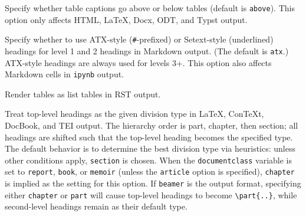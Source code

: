\documentclass[
]{article}
\begin{document}
\begin{description}
Specify whether table captions go above or below tables (default is
\texttt{above}). This option only affects HTML, LaTeX, Docx, ODT, and
Typst output.
\item[\texttt{-\/-markdown-headings=setext}\textbar{}\texttt{atx}]
Specify whether to use ATX-style (\texttt{\#}-prefixed) or Setext-style
(underlined) headings for level 1 and 2 headings in Markdown output.
(The default is \texttt{atx}.) ATX-style headings are always used for
levels 3+. This option also affects Markdown cells in \texttt{ipynb}
output.
\item[\texttt{-\/-list-tables{[}=true\textbar{}false{]}}]
Render tables as list tables in RST output.
\item[\texttt{-\/-top-level-division=default}\textbar{}\texttt{section}\textbar{}\texttt{chapter}\textbar{}\texttt{part}]
Treat top-level headings as the given division type in LaTeX, ConTeXt,
DocBook, and TEI output. The hierarchy order is part, chapter, then
section; all headings are shifted such that the top-level heading
becomes the specified type. The default behavior is to determine the
best division type via heuristics: unless other conditions apply,
\texttt{section} is chosen. When the \texttt{documentclass} variable is
set to \texttt{report}, \texttt{book}, or \texttt{memoir} (unless the
\texttt{article} option is specified), \texttt{chapter} is implied as
the setting for this option. If \texttt{beamer} is the output format,
specifying either \texttt{chapter} or \texttt{part} will cause top-level
headings to become \texttt{\textbackslash{}part\{..\}}, while
second-level headings remain as their default type.


\end{description}
\end{document}
